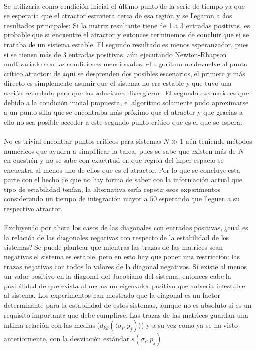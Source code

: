 \\
Se utilizaría como condición inicial el último punto de la serie de tiempo ya que se esperaría que el atractor estuviera cerca de esa región y se llegaron a dos resultados principales: Si la matriz resultante tiene de 1 a 3 entradas positivas, es probable que si encuentre el atractor y entonces terminemos de concluir que si se trataba de un sistema estable. El segundo resultado es menos esperanzador, pues si se tienen más de 3 entradas positivas, aún ejecutando Newton-Rhapson multivariado con las condiciones mencionadas, el algoritmo no devuelve al punto crítico atractor: de aquí se desprenden dos posibles escenarios, el primero y más directo es simplemente asumir que el sistema no era estable y que tuvo una acción retardada para que las soluciones divergieran. El segundo escenario es que debido a la condición inicial propuesta, el algoritmo solamente pudo aproximarse a un punto silla que se encontraba más próximo que el atractor y que gracias a ello no sea posible acceder a este segundo punto crítico que es el que se espera.\\
\\
No es trivial encontrar puntos críticos para sistemas $N\gg1$ aún teniendo métodos numéricos que ayuden a simplificar la tarea, pues se sabe que existen más de $N$ en cuestión y no se sabe con exactitud en que región del hiper-espacio se encuentra al menos uno de ellos que es el atractor. Por lo que se concluye esta parte con el hecho de que no hay forma de saber con la información actual que tipo de estabilidad tenían, la alternativa sería repetir esos experimentos considerando un tiempo de integración mayor a $50$ esperando que lleguen a su respectivo atractor.\\
\\
Excluyendo por ahora los casos de las diagonales con entradas positivas, ¿cual es la relación de las diagonales negativas con respecto de la estabilidad de los sistemas? Se puede plantear que mientras las trazas de las matrices sean negativas el sistema es estable, pero en esto hay que poner una restricción: las trazas negativas con todos lo valores de la diagonal negativos. Si existe al menos un valor positivo en la diagonal del Jacobiano del sistema, entonces cabe la posibilidad de que exista al menos un eigenvalor positivo que volvería intestable al sistema. Los experimentos han mostrado que la diagonal es un factor determinante para la estabilidad de estos sistemas, aunque no es absoluto si es un requisito importante que debe cumplirse. Las trazas de las matrices guardan una íntima relación con las medias ($d_{kk}(\langle \sigma_i,p_j)\rangle$) y a su vez como ya se ha visto anteriormente, con la desviación estándar $s(\sigma_i,p_j)$

